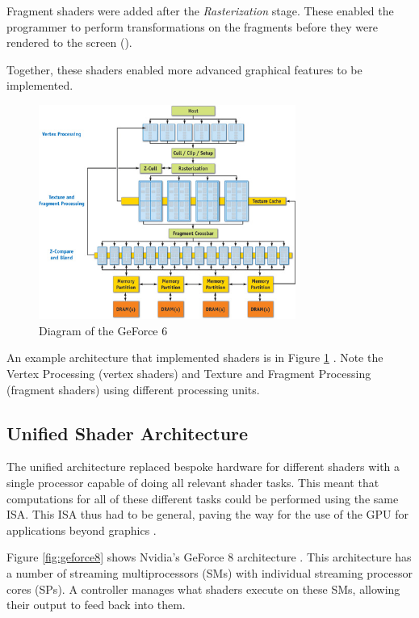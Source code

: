 Fragment shaders were added after the \textit{Rasterization} stage.
These enabled the programmer to perform transformations on the fragments
before they were rendered to the screen (\cite{lsu}).

Together, these shaders enabled more advanced graphical features to
be implemented.

\begin{figure}[h]
    \centering
    \includegraphics[width=0.75\textwidth]{assets/30_geforce6_03.jpg}
    \caption{Diagram of the GeForce 6 }
    \label{fig:geforce6}
\end{figure}

An example architecture that implemented shaders is in Figure \ref{fig:geforce6} \cite{nvidiaChapterGeForce}.
Note the Vertex Processing (vertex shaders) and Texture and Fragment Processing
(fragment shaders) using different processing units.

\subsection{Unified Shader Architecture}

The unified architecture replaced bespoke hardware for different shaders with
a single processor capable of doing all relevant shader tasks.
This meant that computations for all of these different tasks could be performed
using the same ISA. This ISA thus had to be general, paving the way for
the use of the GPU for applications beyond graphics \cite{parojModernUnification}.

Figure \ref{fig:geforce8} shows Nvidia's GeForce 8 architecture \cite{mcclanahan2010history}. This architecture
has a number of streaming multiprocessors (SMs) with individual streaming processor cores
(SPs). A controller manages what shaders execute on these SMs, allowing their output
to feed back into them.


